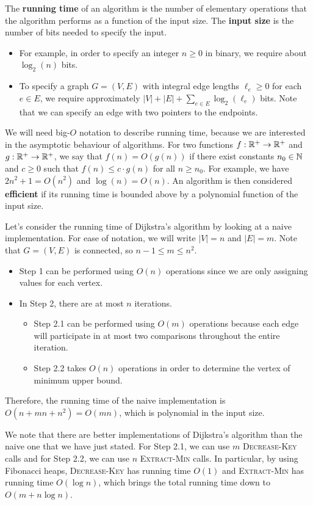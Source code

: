 The {\bf running time} of an algorithm is the number of elementary operations 
that the algorithm performs as a function of the input size. The {\bf input 
size} is the number of bits needed to specify the input. 
\begin{itemize}
    \item For example, in order to specify an integer $n \geq 0$ in binary, 
    we require about $\log_2(n)$ bits. 
    \item To specify a graph $G = (V, E)$ with integral edge lengths 
    $\ell_e \geq 0$ for each $e \in E$, we require approximately 
    $|V| + |E| + \sum_{e\in E} \log_2(\ell_e)$ bits. Note that we can 
    specify an edge with two pointers to the endpoints.
\end{itemize} 
We will need big-$O$ notation to describe running time, because we are 
interested in the asymptotic behaviour of algorithms. For two functions
$f : \mathbb{R}^+ \to \mathbb{R}^+$ and $g : \mathbb{R}^+ \to \mathbb{R}^+$, we say that $f(n) = 
O(g(n))$ if there exist constants $n_0 \in \mathbb{N}$ and $c \geq 0$ such that 
$f(n) \leq c \cdot g(n)$ for all $n \geq n_0$. For example, we have 
$2n^2 + 1 = O(n^2)$ and $\log(n) = O(n)$. An algorithm is then considered 
{\bf efficient} if its running time is bounded above by a polynomial function 
of the input size. 

Let's consider the running time of Dijkstra's algorithm by looking 
at a naive implementation. For ease of notation, we will write 
$|V| = n$ and $|E| = m$. Note that $G = (V, E)$ is connected, 
so $n-1 \leq m \leq n^2$.
\begin{itemize}
    \item Step 1 can be performed using $O(n)$ operations since we are only
    assigning values for each vertex. 
    \item In Step 2, there are at most $n$ iterations. 
    \begin{itemize}
        \item Step 2.1 can be performed using $O(m)$ operations because 
        each edge will participate in at most two comparisons throughout the 
        entire iteration. 
        \item Step 2.2 takes $O(n)$ operations in order to determine the 
        vertex of minimum upper bound. 
    \end{itemize}
\end{itemize}
Therefore, the running time of the naive implementation is 
$O(n + mn + n^2) = O(mn)$, which is polynomial in the input size.  

We note that there are better implementations of Dijkstra's algorithm 
than the naive one that we have just stated. For Step 2.1, we can 
use $m$ \textsc{Decrease-Key} calls and for Step 2.2, we can use 
$n$ \textsc{Extract-Min} calls. In particular, by using Fibonacci heaps, 
\textsc{Decrease-Key} has running time $O(1)$ and \textsc{Extract-Min} 
has running time $O(\log n)$, which brings the total running time down to 
$O(m + n\log n)$.